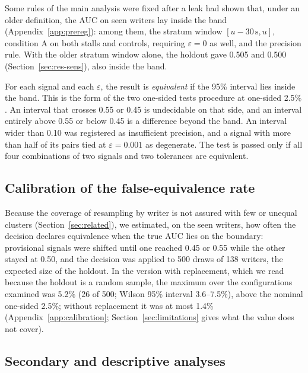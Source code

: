 Some rules of the main analysis were fixed after a leak had shown that, under an older definition, the AUC on seen
writers lay inside the band (Appendix~\ref{app:prereg}): among them, the stratum window $[u - 30\,\mathrm{s}, u]$,
condition A on both stalls and controls, requiring $\varepsilon = 0$ as well, and the precision rule. With the older
stratum window alone, the holdout gave 0.505 and 0.500 (Section~\ref{sec:res-sens}), also inside the band.

For each signal and each $\varepsilon$, the result is \emph{equivalent} if the 95\% interval lies inside the band. This
is the form of the two one-sided tests procedure at one-sided 2.5\% \cite{lakens2017equivalence}. An interval that
crosses 0.55 or 0.45 is undecidable on that side, and an interval entirely above 0.55 or below 0.45 is a difference
beyond the band. An interval wider than 0.10 was registered as insufficient precision, and a signal with more than half
of its pairs tied at $\varepsilon = 0.001$ as degenerate. The test is passed only if all four combinations of two
signals and two tolerances are equivalent.

\subsection{Calibration of the false-equivalence rate}

Because the coverage of resampling by writer is not assured with few or unequal clusters (Section~\ref{sec:related}),
we estimated, on the seen writers, how often the decision declares equivalence when the true AUC lies on the boundary:
provisional signals were shifted until one reached 0.45 or 0.55 while the other stayed at 0.50, and the decision was
applied to 500 draws of 138 writers, the expected size of the holdout. In the version with replacement, which we read
because the holdout is a random sample, the maximum over the configurations examined was 5.2\% (26 of 500; Wilson 95\%
interval 3.6--7.5\%), above the nominal one-sided 2.5\%; without replacement it was at most 1.4\% (Appendix~\ref{app:calibration};
Section~\ref{sec:limitations} gives what the value does not cover).

\subsection{Secondary and descriptive analyses}

